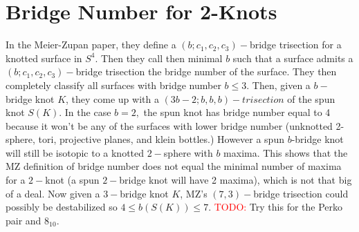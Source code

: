 \documentclass[11pt, oneside]{article}
\begin{document}
\section*{Bridge Number for 2-Knots}
In the Meier-Zupan paper, they define a $(b; c_{1}, c_{2}, c_{3})-$bridge trisection for a knotted surface in $S^{4}.$ Then they call then minimal $b$ such that a surface admits a  $(b; c_{1}, c_{2}, c_{3})-$bridge trisection the bridge number of the surface. They then completely classify all surfaces with bridge number $b \leq 3.$ Then, given a $b-$bridge knot $K$, they come up with a $(3b-2; b, b, b)-trisection$ of the spun knot $S(K).$ In the case $b = 2,$ the spun knot has bridge number equal to 4 because it won't be any of the surfaces with lower bridge number (unknotted 2-sphere, tori, projective planes, and klein bottles.) However a spun $b$-bridge knot will still be isotopic to a knotted $2-$sphere with $b$ maxima. This shows that the MZ definition of bridge number does not equal the minimal number of maxima for a $2-$knot (a spun $2-$bridge knot will have 2 maxima), which is not that big of a deal. Now given a $3-$bridge knot $K$, MZ's $(7, 3)-$bridge trisection could possibly be destabilized so $4 \leq b(S(K)) \leq 7.$ \textcolor{red}{TODO:} Try this for the Perko pair and $8_{10}.$
\end{document}
